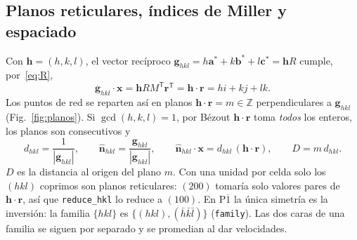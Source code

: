 \documentclass[11pt,a4paper]{article}
\newcommand{\code}[1]{\texttt{#1}}
\newcommand{\vect}[1]{\mathbf{#1}}
\begin{document}
\subsection{Planos reticulares, índices de Miller y espaciado}

Con $\vect h=(h,k,l)$, el vector recíproco $\vect g_{hkl}=h\vect a^*+k\vect b^*+l\vect c^*=\vect h R$
cumple, por~\eqref{eq:R},
\begin{equation}
\vect g_{hkl}\cdot\vect x=\vect h R M^{\mathsf T}\vect r^{\mathsf T}=\vect h\cdot\vect r=hi+kj+lk .
\label{eq:gx}
\end{equation}
Los puntos de red se reparten así en planos $\vect h\cdot\vect r=m\in\mathbb Z$ perpendiculares a
$\vect g_{hkl}$ (Fig.~\ref{fig:planos}). Si $\gcd(h,k,l)=1$, por Bézout $\vect h\cdot\vect r$ toma
\emph{todos} los enteros, los planos son consecutivos y
\begin{equation}
d_{hkl}=\frac{1}{|\vect g_{hkl}|},\qquad \hat{\vect n}_{hkl}=\frac{\vect g_{hkl}}{|\vect g_{hkl}|},\qquad
\hat{\vect n}_{hkl}\cdot\vect x=d_{hkl}\,(\vect h\cdot\vect r),\qquad D=m\,d_{hkl}.
\label{eq:dhkl}
\end{equation}
$D$ es la distancia al origen del plano $m$. Con una unidad por celda solo los $(hkl)$ coprimos son
planos reticulares: $(200)$ tomaría solo valores pares de $\vect h\cdot\vect r$, así que
\code{reduce\_hkl} lo reduce a $(100)$. En P$\overline1$ la única simetría es la inversión: la
familia $\{hkl\}$ es $\{(hkl),(\bar h\bar k\bar l)\}$ (\code{family}). Las dos caras de una familia se
siguen por separado y se promedian al dar velocidades.
\end{document}
